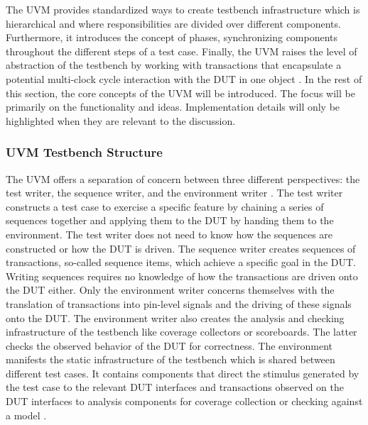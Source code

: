 The UVM provides standardized ways to create testbench infrastructure which is hierarchical and where
responsibilities are divided over different components. Furthermore, it introduces the concept of phases,
synchronizing components throughout the different steps of a test case. Finally, the UVM raises the level of
abstraction of the testbench by working with transactions that encapsulate a potential multi-clock cycle interaction
with the DUT in one object \cite[ch. 4.1]{mehta2018asic}. In the rest of this section, the core concepts of the UVM
will be introduced. The focus will be primarily on the functionality and ideas. Implementation details will only be
highlighted when they are relevant to the discussion.

\subsubsection{UVM Testbench Structure} %

The UVM offers a separation of concern between three different perspectives: the test writer, the sequence writer, and
the environment writer \cite{sutherland2015uvm}. The test writer constructs a test case to exercise a specific
feature by chaining a series of sequences together and applying them to the DUT by handing them to the environment.
The test writer does not need to know how the sequences are constructed or how the DUT is driven. The sequence writer creates
sequences of transactions, so-called sequence items, which achieve a specific goal in the DUT. Writing sequences requires no knowledge of how the transactions are
driven onto the DUT either. Only the environment writer concerns themselves with the translation of transactions into
pin-level signals and the driving of these signals onto the DUT. The environment writer also creates the analysis and
checking infrastructure of the testbench like coverage collectors or scoreboards. The latter checks the observed behavior of the DUT for correctness. The environment manifests the
static infrastructure of the testbench which is shared between different test cases. It contains components that
direct the stimulus generated by the test case to the relevant DUT interfaces and transactions observed on the DUT
interfaces to analysis components for coverage
collection or checking against a model \cite{sutherland2015uvm}.

